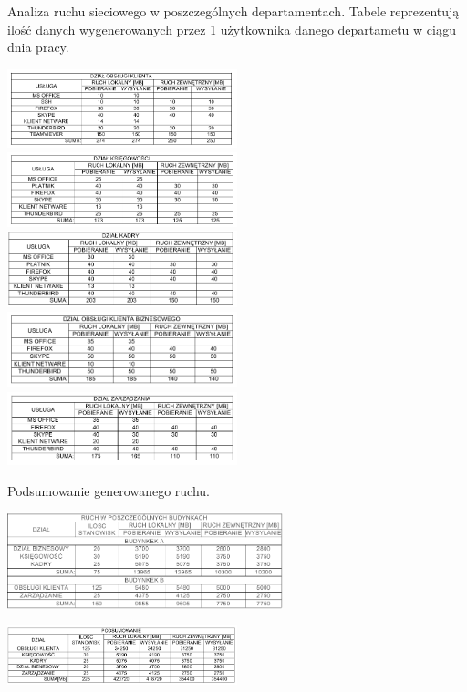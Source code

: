 \documentclass{report}
\begin{document}
\begin{table}[H]

\centering
\caption{Analiza ruchu sieciowego w poszczególnych departamentach.
Tabele reprezentują ilość danych wygenerowanych przez 1 użytkownika danego departametu w ciągu dnia pracy. \label{tab:analiza dzialy}}

\includegraphics[width=0.5\textwidth]{./obrazki/ruch_tabele/d_ok.png}
\includegraphics[width=0.5\textwidth]{./obrazki/ruch_tabele/d_k.png}
\includegraphics[width=0.5\textwidth]{./obrazki/ruch_tabele/d_kad.png}
\includegraphics[width=0.5\textwidth]{./obrazki/ruch_tabele/d_b.png}
\includegraphics[width=0.5\textwidth]{./obrazki/ruch_tabele/d_m.png}   

\end{table}


\begin{table}[H]

\centering
\caption{Podsumowanie generowanego ruchu. \label{tab:analiza podsumowanie}}

\includegraphics[width=0.6\textwidth]{./obrazki/ruch_tabele/budynki.png}

\hspace{0,5cm}

      \includegraphics[width=0.5\textwidth]{./obrazki/ruch_tabele/podsumowanie.png}     
 
\end{table}
\end{document}
